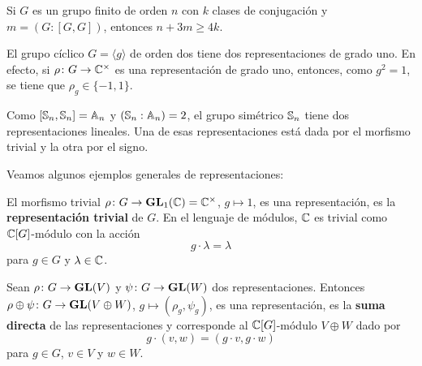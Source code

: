 \begin{exercise}
\label{xca:n+3mgeq4k}
    Si $G$ es un grupo finito de orden $n$ con $k$ clases de conjugación y 
    $m=(G:[G,G])$, entonces $n+3m\geq 4k$. 
\end{exercise}



\begin{example}
  El grupo cíclico $G=\langle g\rangle$ de orden dos tiene dos representaciones de grado uno. En efecto, 
  si $\rho\colon G\to\mathbb{C}^{\times}$ es una representación de grado uno, entonces, como $g^2=1$, se tiene que
  $\rho_g\in\{-1,1\}$. 
\end{example}

\begin{example}
    Como $[\mathbb{S}_n,\mathbb{S}_n]=\mathbb{A}_n$ y $(\mathbb{S}_n:\mathbb{A}_n)=2$, el grupo 
    simétrico $\mathbb{S}_n$ tiene dos representaciones lineales. 
    Una de esas representaciones está dada por el morfismo trivial y la otra por el signo. 
\end{example}

Veamos algunos ejemplos generales de representaciones:

\begin{example}
    El morfismo trivial $\rho\colon G\to\mathbf{GL}_1(\mathbb{C})=\mathbb{C}^{\times}$, $g\mapsto 1$, es una representación, 
    es la \textbf{representación trivial} de $G$. En el lenguaje de módulos, 
	$\mathbb{C}$ es trivial como $\mathbb{C}[G]$-módulo con la acción
	\[
	g\cdot \lambda=\lambda
	\]
	para $g\in G$ y $\lambda\in\mathbb{C}$.
\end{example}

\begin{example}
  Sean $\rho\colon G\to\mathbf{GL}(V)$ y $\psi\colon G\to\mathbf{GL}(W)$ dos representaciones.
  Entonces $\rho\oplus\psi\colon G\to\mathbf{GL}(V\oplus W)$, $g\mapsto (\rho_g,\psi_g)$, 
  es una representación, es la 
  \textbf{suma directa} de las representaciones y corresponde al $\mathbb{C}[G]$-módulo 
  $V\oplus W$ dado por 
  \[
  g\cdot (v,w)=(g\cdot v,g\cdot w)
  \]
  para $g\in G$, $v\in V$ y $w\in W$. 
\end{example}

